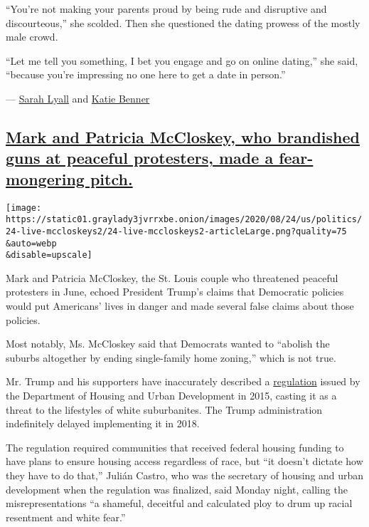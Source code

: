 ``You're not making your parents proud by being rude and disruptive and
discourteous,'' she scolded. Then she questioned the dating prowess of
the mostly male crowd.

``Let me tell you something, I bet you engage and go on online dating,''
she said, ``because you're impressing no one here to get a date in
person.''

--- \href{https://www.nytimes3xbfgragh.onion/by/sarah-lyall}{Sarah
Lyall} and
\href{https://www.nytimes3xbfgragh.onion/by/katie-benner}{Katie Benner}

\hypertarget{mark-and-patricia-mccloskey-who-brandished-guns-at-peaceful-protesters-made-a-fear-mongering-pitch}{%
\subsection{\texorpdfstring{\protect\hyperlink{mark-and-patricia-mccloskey-who-brandished-guns-at-peaceful-protesters-made-a-fear-mongering-pitch}{Mark
and Patricia McCloskey, who brandished guns at peaceful protesters, made
a fear-mongering
pitch.}}{Mark and Patricia McCloskey, who brandished guns at peaceful protesters, made a fear-mongering pitch.}}\label{mark-and-patricia-mccloskey-who-brandished-guns-at-peaceful-protesters-made-a-fear-mongering-pitch}}

\texttt{[image: https://static01.graylady3jvrrxbe.onion/images/2020/08/24/us/politics/24-live-mccloskeys2/24-live-mccloskeys2-articleLarge.png?quality=75\\\&auto=webp\\\&disable=upscale]}

Mark and Patricia McCloskey, the St. Louis couple who threatened
peaceful protesters in June, echoed President Trump's claims that
Democratic policies would put Americans' lives in danger and made
several false claims about those policies.

Most notably, Ms. McCloskey said that Democrats wanted to ``abolish the
suburbs altogether by ending single-family home zoning,'' which is not
true.

Mr. Trump and his supporters have inaccurately described a
\href{https://www.federalregister.gov/documents/2015/07/16/2015-17032/affirmatively-furthering-fair-housing}{regulation}
issued by the Department of Housing and Urban Development in 2015,
casting it as a threat to the lifestyles of white suburbanites. The
Trump administration indefinitely delayed implementing it in 2018.

The regulation required communities that received federal housing
funding to have plans to ensure housing access regardless of race, but
``it doesn't dictate how they have to do that,'' Julián Castro, who was
the secretary of housing and urban development when the regulation was
finalized, said Monday night, calling the misrepresentations ``a
shameful, deceitful and calculated ploy to drum up racial resentment and
white fear.''

